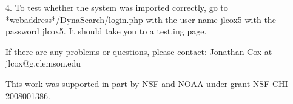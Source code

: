 \documentclass[article]{ij4uq}              %
\begin{document}
4. To test whether the system was imported correctly, go to *webaddress*/DynaSearch/login.php with the user name jlcox5 with the password jlcox5. It should take you to a test.ing page. 

If there are any problems or questions, please contact: 
Jonathan Cox at jlcox@g.clemson.edu 

\acknowledgements

This work was supported in part by NSF and NOAA under grant NSF CHI 2008001386.















\end{document}
